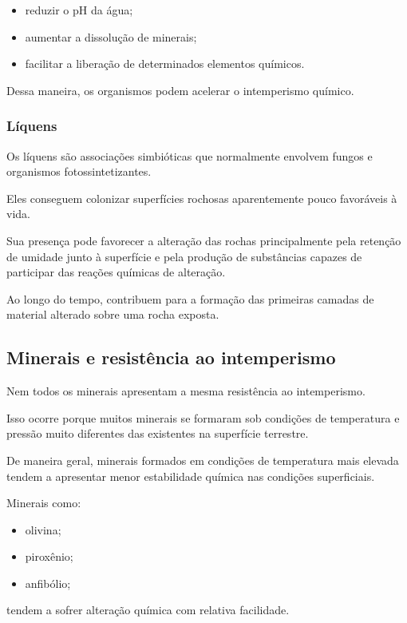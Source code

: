\documentclass[a4paper,12pt]{article}
\theoremstyle{definition}
\theoremstyle{definition}
\theoremstyle{definition}
\begin{document}
\begin{itemize}
    \item reduzir o pH da água;
    \item aumentar a dissolução de minerais;
    \item facilitar a liberação de determinados elementos químicos.
\end{itemize}

Dessa maneira, os organismos podem acelerar o intemperismo químico.

\subsubsection{Líquens}

Os líquens são associações simbióticas que normalmente envolvem fungos e organismos fotossintetizantes.

Eles conseguem colonizar superfícies rochosas aparentemente pouco favoráveis à vida.

Sua presença pode favorecer a alteração das rochas principalmente pela retenção de umidade junto à superfície e pela produção de substâncias capazes de participar das reações químicas de alteração.

Ao longo do tempo, contribuem para a formação das primeiras camadas de material alterado sobre uma rocha exposta.

\subsection{Minerais e resistência ao intemperismo}

Nem todos os minerais apresentam a mesma resistência ao intemperismo.

Isso ocorre porque muitos minerais se formaram sob condições de temperatura e pressão muito diferentes das existentes na superfície terrestre.

De maneira geral, minerais formados em condições de temperatura mais elevada tendem a apresentar menor estabilidade química nas condições superficiais.

Minerais como:

\begin{itemize}
    \item olivina;
    \item piroxênio;
    \item anfibólio;
\end{itemize}

tendem a sofrer alteração química com relativa facilidade.
\end{document}
